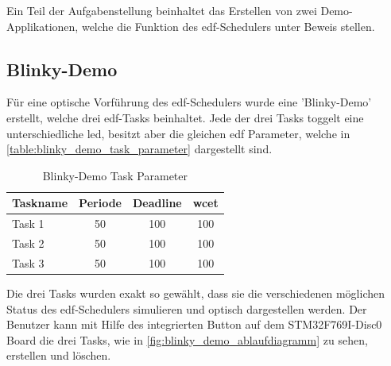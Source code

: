\documentclass[../EDF Master Thesis.tex]{subfiles}
\begin{document}
    Ein Teil der Aufgabenstellung beinhaltet das Erstellen von zwei Demo-Applikationen, welche die Funktion des \ac{edf}-Schedulers unter Beweis stellen.

    \subsection{Blinky-Demo} \label{section:blinky_demo}
    Für eine optische Vorführung des \ac{edf}-Schedulers wurde eine 'Blinky-Demo' erstellt, welche drei \ac{edf}-Tasks beinhaltet.
    Jede der drei Tasks toggelt eine unterschiedliche \ac{led}, besitzt aber die gleichen \ac{edf} Parameter, welche in \autoref{table:blinky_demo_task_parameter} dargestellt sind.

    \begin{table}[ht!]
        \centering
        \begin{tabular}{l|c|c|c}
            Taskname & Periode & Deadline & \ac{wcet} \\
            \hline
            Task 1 & 50 & 100 & 100\\
            Task 2 & 50 & 100 & 100\\
            Task 3 & 50 & 100 & 100\\
        \end{tabular}
        \caption{Blinky-Demo Task Parameter}
        \label{table:blinky_demo_task_parameter}
    \end{table}

    Die drei Tasks wurden exakt so gewählt, dass sie die verschiedenen möglichen Status des \ac{edf}-Schedulers simulieren und optisch dargestellen werden.
    Der Benutzer kann mit Hilfe des integrierten Button auf dem STM32F769I-Disc0 Board die drei Tasks, wie in \autoref{fig:blinky_demo_ablaufdiagramm} zu sehen, erstellen und löschen.
    
\end{document}
